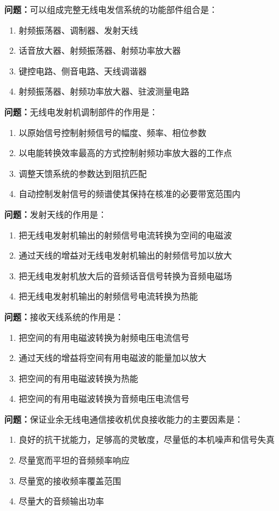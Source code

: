 \documentclass{ctexbook}%
\begin{document}
\textbf{问题：}可以组成完整无线电发信系统的功能部件组合是：
\begin{enumerate}[label=\Alph*), leftmargin=3em]
\item 射频振荡器、调制器、发射天线
\item 话音放大器、射频振荡器、射频功率放大器
\item 键控电路、侧音电路、天线调谐器
\item 射频振荡器、射频功率放大器、驻波测量电路
\end{enumerate}

\textbf{问题：}无线电发射机调制部件的作用是：
\begin{enumerate}[label=\Alph*), leftmargin=3em]
\item 以原始信号控制射频信号的幅度、频率、相位参数
\item 以电能转换效率最高的方式控制射频功率放大器的工作点
\item 调整天馈系统的参数达到阻抗匹配
\item 自动控制发射信号的频谱使其保持在核准的必要带宽范围内
\end{enumerate}

\textbf{问题：}发射天线的作用是：
\begin{enumerate}[label=\Alph*), leftmargin=3em]
\item 把无线电发射机输出的射频信号电流转换为空间的电磁波
\item 通过天线的增益对无线电发射机输出的射频信号加以放大
\item 把无线电发射机放大后的音频话音信号转换为音频电磁场
\item 把无线电发射机输出的射频信号电流转换为热能
\end{enumerate}

\textbf{问题：}接收天线系统的作用是：
\begin{enumerate}[label=\Alph*), leftmargin=3em]
\item 把空间的有用电磁波转换为射频电压电流信号
\item 通过天线的增益将空间有用电磁波的能量加以放大
\item 把空间的有用电磁波转换为热能
\item 把空间的有用电磁波转换为音频电压电流信号
\end{enumerate}

\textbf{问题：}保证业余无线电通信接收机优良接收能力的主要因素是：
\begin{enumerate}[label=\Alph*), leftmargin=3em]
\item 良好的抗干扰能力，足够高的灵敏度，尽量低的本机噪声和信号失真
\item 尽量宽而平坦的音频频率响应
\item 尽量宽的接收频率覆盖范围
\item 尽量大的音频输出功率
\end{enumerate}
\end{document}
